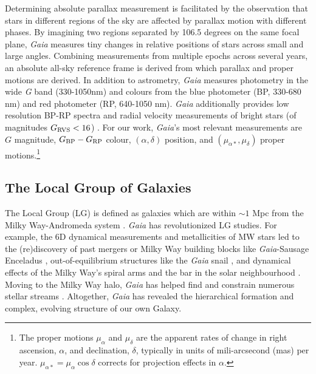 Determining absolute parallax measurement is facilitated by the
observation that stars in different regions of the sky are affected by
parallax motion with different phases. By imagining two regions
separated by 106.5 degrees on the same focal plane, \emph{Gaia} measures
tiny changes in relative positions of stars across small and large
angles. Combining measurements from multiple epochs across several
years, an absolute all-sky reference frame is derived from which
parallax and proper motions are derived. In addition to astrometry,
\emph{Gaia} measures photometry in the wide \emph{G} band (330-1050nm)
and colours from the blue photometer (BP, 330-680 nm) and red photometer
(RP, 640-1050 nm). \emph{Gaia} additionally provides low resolution
BP-RP spectra and radial velocity measurements of bright stars (of
magnitudes \(G_{\rm RVS} < 16\)) \citep{gaiacollaboration+2016}. For our
work, \emph{Gaia}'s most relevant measurements are \(G\) magnitude,
\(G_{\rm BP} - G_{\rm RP}\) colour, \((\alpha, \delta)\) position, and
\((\mu_{\alpha*}, \mu_\delta)\) proper motions.\footnote{The proper
  motions \(\mu_\alpha\) and \(\mu_\delta\) are the apparent rates of
  change in right ascension, \(\alpha\), and declination, \(\delta\),
  typically in units of mili-arcsecond (mas) per year.
  \(\mu_{\alpha*} = \mu_\alpha \cos \delta\) corrects for projection
  effects in \(\alpha\).}

\subsection{The Local Group of
Galaxies}\label{the-local-group-of-galaxies}

The Local Group (LG) is defined as galaxies which are within \(\sim 1\)
Mpc from the Milky Way-Andromeda system \citep[e.g.,][ and references
therein]{mcconnachie2012}. \emph{Gaia} has revolutionized LG studies.
For example, the 6D dynamical measurements and metallicities of MW stars
led to the (re)discovery of past mergers or Milky Way building blocks
like \emph{Gaia}-Sausage Enceladus
\citetext{\citealp[e.g.,][]{helmi+2018}; \citealp{belokurov+2018}; \citealp[but
see also][]{mesa+2005}}, out-of-equilibrium structures like the
\emph{Gaia} snail \citep[e.g.,][]{antoja+2018}, and dynamical effects of
the Milky Way's spiral arms and the bar in the solar neighbourhood
\citep{hunt+vasiliev2025}. Moving to the Milky Way halo, \emph{Gaia} has
helped find and constrain numerous stellar streams
\citep[\citet{bonaca+price-whelan2025}]{ibata+malhan+martin2019}.
Altogether, \emph{Gaia} has revealed the hierarchical formation and
complex, evolving structure of our own Galaxy.

